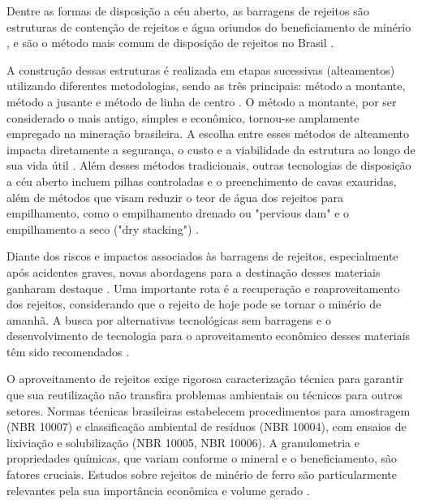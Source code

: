 Dentre as formas de disposição a céu aberto, as barragens de rejeitos são estruturas de contenção de rejeitos e água oriundos do beneficiamento de minério \cite{lozano2006}, e são o método mais comum de disposição de rejeitos no Brasil \cite{ibram2016}.

A construção dessas estruturas é realizada em etapas sucessivas (alteamentos) utilizando diferentes metodologias, sendo as três principais: método a montante, método a jusante e método de linha de centro \cite{ibram2006}. O método a montante, por ser considerado o mais antigo, simples e econômico, tornou-se amplamente empregado na mineração brasileira. A escolha entre esses métodos de alteamento impacta diretamente a segurança, o custo e a viabilidade da estrutura ao longo de sua vida útil \cite{cardozo2017}. Além desses métodos tradicionais, outras tecnologias de disposição a céu aberto incluem pilhas controladas e o preenchimento de cavas exauridas, além de métodos que visam reduzir o teor de água dos rejeitos para empilhamento, como o empilhamento drenado ou "pervious dam" e o empilhamento a seco ("dry stacking") \cite{ibram2016}.

Diante dos riscos e impactos associados às barragens de rejeitos, especialmente após acidentes graves, novas abordagens para a destinação desses materiais ganharam destaque \cite{freire2020}. Uma importante rota é a recuperação e reaproveitamento dos rejeitos, considerando que o rejeito de hoje pode se tornar o minério de amanhã. A busca por alternativas tecnológicas sem barragens e o desenvolvimento de tecnologia para o aproveitamento econômico desses materiais têm sido recomendados \cite{carvalho2018}.

O aproveitamento de rejeitos exige rigorosa caracterização técnica para garantir que sua reutilização não transfira problemas ambientais ou técnicos para outros setores. Normas técnicas brasileiras estabelecem procedimentos para amostragem (NBR 10007) e classificação ambiental de resíduos (NBR 10004), com ensaios de lixiviação e solubilização (NBR 10005, NBR 10006). A granulometria e propriedades químicas, que variam conforme o mineral e o beneficiamento, são fatores cruciais. Estudos sobre rejeitos de minério de ferro são particularmente relevantes pela sua importância econômica e volume gerado \cite{freire2020}.

